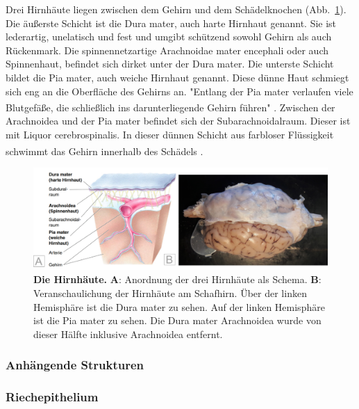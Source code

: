 \documentclass[12pt,a4paper,pdftex]{article}
\begin{document}
Drei Hirnhäute liegen zwischen dem Gehirn und dem Schädelknochen (Abb.~\ref{fig:hirnhaeute}). Die äußerste Schicht ist die Dura mater, auch harte Hirnhaut genannt. Sie ist lederartig, unelatisch und fest und umgibt schützend sowohl Gehirn als auch Rückenmark. Die spinnennetzartige Arachnoidae mater encephali oder auch Spinnenhaut, befindet sich dirket unter der Dura mater. Die unterste Schicht bildet die Pia mater, auch weiche Hirnhaut genannt. Diese dünne Haut schmiegt sich eng an die Oberfläche des Gehirns an. "Entlang der Pia mater verlaufen viele Blutgefäße, die schließlich ins darunterliegende Gehirn führen" \textsuperscript{\cite[7]{neurowissenschaften_baer}}. Zwischen der Arachnoidea und der Pia mater befindet sich der Subarachnoidalraum. Dieser ist mit Liquor cerebrospinalis. In dieser dünnen Schicht aus farbloser Flüssigkeit schwimmt das Gehirn innerhalb des Schädels \textsuperscript{\cite[7]{neurowissenschaften_baer}}.

\begin{figure}[H]
	\centering
	\includegraphics[width=\textwidth]{pictures/Bilder_Jule/Andere/hirnhaeute2.png}
	\caption[Die Hirnhäute]{\textbf{Die Hirnhäute.} \textbf{A}: Anordnung der drei Hirnhäute als Schema. \textbf{B}: Veranschaulichung der Hirnhäute am Schafhirn. Über der linken Hemisphäre ist die Dura mater zu sehen. Auf der linken Hemisphäre ist die Pia mater zu sehen. Die Dura mater Arachnoidea wurde von dieser Hälfte inklusive Arachnoidea entfernt.}
	\label{fig:hirnhaeute}
\end{figure}


\subsubsection{Anhängende Strukturen}
\label{subsubsec:Hirnanhangsstrukturen}

\subsubsection*{Riechepithelium} 
\end{document}
